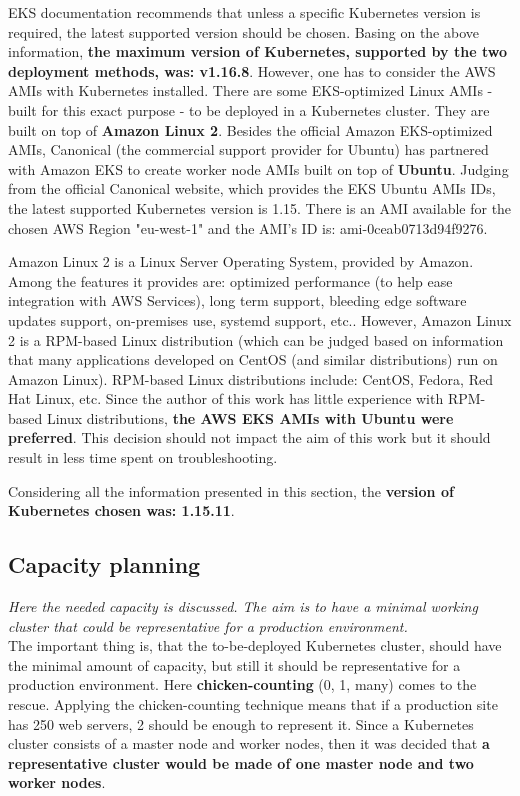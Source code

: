 EKS documentation recommends that unless a specific Kubernetes version is required, the latest supported version should be chosen\cite{online-eks-versions}. Basing on the above information, \textbf{the maximum version of Kubernetes, supported by the two deployment methods, was: v1.16.8}. However, one has to consider the AWS AMIs with Kubernetes installed. There are some EKS-optimized Linux AMIs - built for this exact purpose - to be deployed in a Kubernetes cluster. They are built on top of \textbf{Amazon Linux 2}\cite{eks-optimized-ami}. Besides the official Amazon EKS-optimized AMIs, Canonical (the commercial support provider for Ubuntu) has partnered with Amazon EKS to create worker node AMIs built on top of \textbf{Ubuntu}\cite{eks-ubu}. Judging from the official Canonical website, which provides the EKS Ubuntu AMIs IDs, the latest supported Kubernetes version is 1.15. There is an AMI available for the chosen AWS Region "eu-west-1" and the AMI's ID is: ami-0ceab0713d94f9276\cite{eks-ubu-ami-id}.

Amazon Linux 2 is a Linux Server Operating System, provided by Amazon. Among the features it provides are: optimized performance (to help ease integration with AWS Services), long term support, bleeding edge software updates support, on-premises use, systemd support, etc.\cite{al2}. However, Amazon Linux 2 is a RPM-based Linux distribution (which can be judged based on information that many applications developed on CentOS (and similar distributions) run on Amazon Linux)\cite{al2-centos}. RPM-based Linux distributions include: CentOS, Fedora, Red Hat Linux, etc. Since the author of this work has little experience with RPM-based Linux distributions, \textbf{the AWS EKS AMIs with Ubuntu were preferred}. This decision should not impact the aim of this work but it should result in less time spent on troubleshooting.

Considering all the information presented in this section, the \textbf{version of Kubernetes chosen was: 1.15.11}.


\subsection{Capacity planning}
\textit{Here the needed capacity is discussed. The aim is to have a minimal working cluster that could be representative for a production environment.}
\\

The important thing is, that the to-be-deployed Kubernetes cluster, should have the minimal amount of capacity, but still it should be representative for a production environment. Here \textbf{chicken-counting} (0, 1, many) comes to the rescue. Applying the chicken-counting technique means that if a production site has 250 web servers, 2 should be enough to represent it\cite{book-cicd}. Since a Kubernetes cluster consists of a master node and worker nodes, then it was decided that \textbf{a representative cluster would be made of one master node and two worker nodes}.


